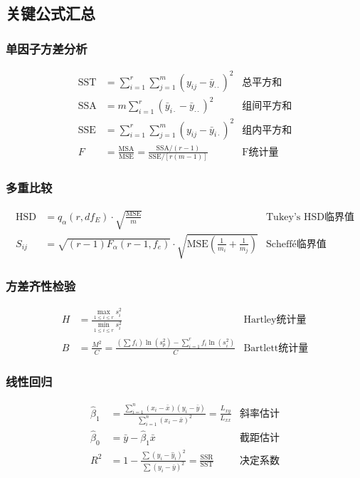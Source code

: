 \documentclass[12pt, a4paper]{amsart}
\begin{document}
\subsection{关键公式汇总}

\subsubsection{单因子方差分析}
\begin{align*}
\text{SST} &= \sum_{i=1}^{r} \sum_{j=1}^{m} (y_{ij} - \bar{y}_{\cdot\cdot})^2 & \text{总平方和} \\
\text{SSA} &= m \sum_{i=1}^{r} (\bar{y}_{i\cdot} - \bar{y}_{\cdot\cdot})^2 & \text{组间平方和} \\
\text{SSE} &= \sum_{i=1}^{r} \sum_{j=1}^{m} (y_{ij} - \bar{y}_{i\cdot})^2 & \text{组内平方和} \\
F &= \frac{\text{MSA}}{\text{MSE}} = \frac{\text{SSA}/(r-1)}{\text{SSE}/[r(m-1)]} & \text{F统计量}
\end{align*}

\subsubsection{多重比较}
\begin{align*}
\text{HSD} &= q_{\alpha}(r, df_E) \cdot \sqrt{\frac{\text{MSE}}{m}} & \text{Tukey's HSD临界值} \\
S_{ij} &= \sqrt{(r-1)F_{\alpha}(r-1, f_e)} \cdot \sqrt{\text{MSE}(\frac{1}{m_i} + \frac{1}{m_j})} & \text{Scheffé临界值}
\end{align*}

\subsubsection{方差齐性检验}
\begin{align*}
H &= \frac{\max_{1 \leq i \leq r} s_i^2}{\min_{1 \leq i \leq r} s_i^2} & \text{Hartley统计量} \\
B &= \frac{M^2}{C} = \frac{(\sum f_i) \ln(s_p^2) - \sum_{i=1}^{r} f_i \ln(s_i^2)}{C} & \text{Bartlett统计量}
\end{align*}

\subsubsection{线性回归}
\begin{align*}
\hat{\beta}_1 &= \frac{\sum_{i=1}^{n} (x_i - \bar{x})(y_i - \bar{y})}{\sum_{i=1}^{n} (x_i - \bar{x})^2} = \frac{L_{xy}}{L_{xx}} & \text{斜率估计} \\
\hat{\beta}_0 &= \bar{y} - \hat{\beta}_1 \bar{x} & \text{截距估计} \\
R^2 &= 1 - \frac{\sum(y_i - \hat{y}_i)^2}{\sum(y_i - \bar{y})^2} = \frac{\text{SSR}}{\text{SST}} & \text{决定系数}
\end{align*}
\end{document}
